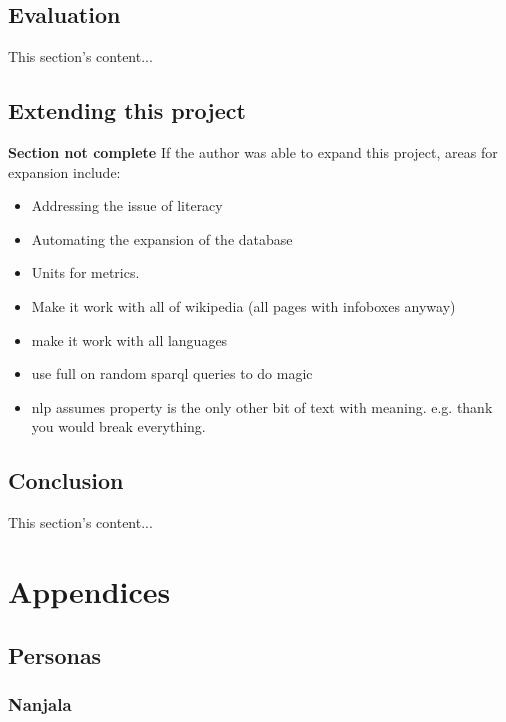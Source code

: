 \documentclass[authoryearcitations]{UoYCSproject}
\begin{document}
\newpage

\newpage
\chapter{Evaluation}
\label{sec:evaluation}
This section's content...

\newpage

\chapter{Extending this project}
\label{sec:extending}
{\bf Section not complete} %
If the author was able to expand this project, areas for expansion include:
\begin{itemize}
  \item Addressing the issue of literacy
  \item Automating the expansion of the database
  \item Units for metrics.
  \item Make it work with all of wikipedia (all pages with infoboxes anyway)
  \item make it work with all languages
  \item use full on random sparql queries to do magic
  \item nlp assumes property is the only other bit of text with meaning. e.g. thank you would break everything.
\end{itemize}

\newpage

\chapter{Conclusion}
\label{sec:conclusion}
This section's content...

\newpage




\appendix
\part{Appendices}

\newpage
\chapter{Personas}
\label{sec:appendixPersonas}
\section{Nanjala}
\end{document}
